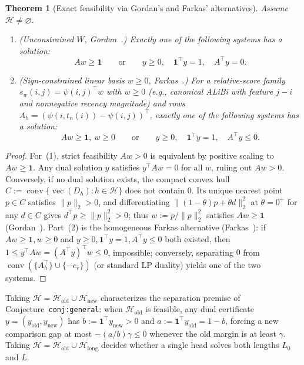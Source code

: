 \documentclass[11pt]{article}
\theoremstyle{plain}
\newtheorem{theorem}{Theorem}
\theoremstyle{definition}
\theoremstyle{remark}
\DeclareMathOperator{\conv}{conv}
\DeclareMathOperator{\vecop}{vec}
\begin{document}
\begin{theorem}[Exact feasibility via Gordan's and Farkas' alternatives]\label{thm:alt}
Assume $\mathcal{H} \neq \varnothing$.
\begin{enumerate}[label=\textup{(\arabic*)},itemsep=2pt]
\item \emph{(Unconstrained $W$, Gordan~\cite{Gordan1873}.)} Exactly one of the following systems has a solution:
\[
Aw \ge \mathbf{1}
\qquad\text{or}\qquad
y \ge 0,\quad \mathbf{1}^\top y = 1,\quad A^\top y = 0.
\]
\item \emph{(Sign-constrained linear basis $w \ge 0$, Farkas~\cite{Farkas1902}.)} For a relative-score family $s_w(i, j) = \psi(i, j)^\top w$ with $w \ge 0$ (e.g., canonical ALiBi with feature $j - i$ and nonnegative recency magnitude) and rows $A_h = (\psi(i, t_n(i)) - \psi(i, j))^\top$, exactly one of the following systems has a solution:
\[
Aw \ge \mathbf{1},\ w \ge 0
\qquad\text{or}\qquad
y \ge 0,\quad \mathbf{1}^\top y = 1,\quad A^\top y \le 0.
\]
\end{enumerate}
\end{theorem}

\begin{proof}
For~(1), strict feasibility $Aw > 0$ is equivalent by positive scaling to $Aw \ge \mathbf{1}$. Any dual solution $y$ satisfies $y^\top A w = 0$ for all $w$, ruling out $Aw > 0$. Conversely, if no dual solution exists, the compact convex hull $C := \conv\{\vecop(D_h) : h \in \mathcal{H}\}$ does not contain $0$. Its unique nearest point $p \in C$ satisfies $\|p\|_2 > 0$, and differentiating $\|(1 - \theta)p + \theta d\|_2^2$ at $\theta = 0^+$ for any $d \in C$ gives $d^\top p \ge \|p\|_2^2 > 0$; thus $w := p / \|p\|_2^2$ satisfies $Aw \ge \mathbf{1}$ (Gordan~\cite{Gordan1873}).
Part~(2) is the homogeneous Farkas alternative (Farkas~\cite{Farkas1902}): if $Aw \ge \mathbf{1}, w \ge 0$ and $y \ge 0, \mathbf{1}^\top y = 1, A^\top y \le 0$ both existed, then $1 \le y^\top Aw = (A^\top y)^\top w \le 0$, impossible; conversely, separating $0$ from $\conv(\{A_h^\top\} \cup \{-e_r\})$ (or standard LP duality) yields one of the two systems.
\end{proof}

Taking $\mathcal{H} = \mathcal{H}_{\mathrm{old}} \cup \mathcal{H}_{\mathrm{new}}$ characterizes the separation premise of Conjecture~\texttt{conj:general}: when $\mathcal{H}_{\mathrm{old}}$ is feasible, any dual certificate $y = (y_{\mathrm{old}}, y_{\mathrm{new}})$ has $b := \mathbf{1}^\top y_{\mathrm{new}} > 0$ and $a := \mathbf{1}^\top y_{\mathrm{old}} = 1 - b$, forcing a new comparison gap at most $-(a/b)\gamma \le 0$ whenever the old margin is at least $\gamma$.
Taking $\mathcal{H} = \mathcal{H}_{\mathrm{old}} \cup \mathcal{H}_{\mathrm{long}}$ decides whether a single head solves both lengths $L_0$ and $L$.
\end{document}
